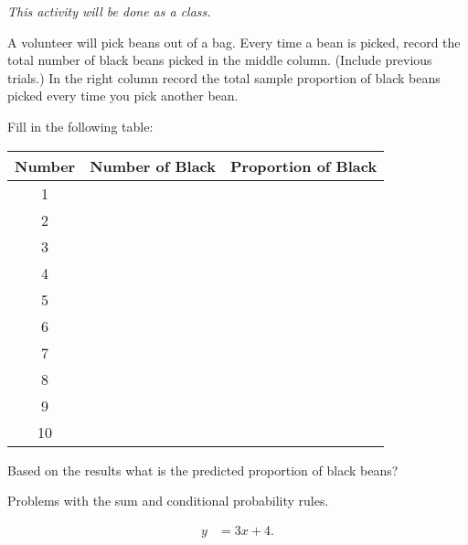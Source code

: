 
\begin{problem}

\item \textit{This activity will be done as a class.}

  A volunteer will pick beans out of a bag. Every time a bean is
  picked, record the total number of black beans picked in the middle
  column. (Include previous trials.) In the right column record the
  total sample proportion of black beans picked every time you pick
  another bean.

\item Fill in the following table:

  \begin{tabular}{| c | c | r |}
    \hline 
    Number & Number of Black & Proportion of Black \\  \hline 
    1 &  & \\  [12pt] \hline 
    2 & & \\  [12pt] \hline 
    3 & & \\  [12pt] \hline 
    4 & & \\  [12pt]  \hline 
    5 & & \\  [12pt] \hline 
    6 & & \\  [12pt] \hline 
    7 & & \\  [12pt] \hline 
    8 & & \\  [12pt] \hline 
    9 & & \\  [12pt] \hline 
    10 & & \\  [12pt] \hline 
  \end{tabular}

\item Based on the results what is the predicted proportion of black beans? 


\end{problem}



\begin{problem}
\item Problems with the sum and conditional probability rules.

  \begin{subproblem}
  \item 
    \begin{eqnarray}
      y & = 3x + 4.
    \end{eqnarray}
    \vfill
  \end{subproblem}


\end{problem}



